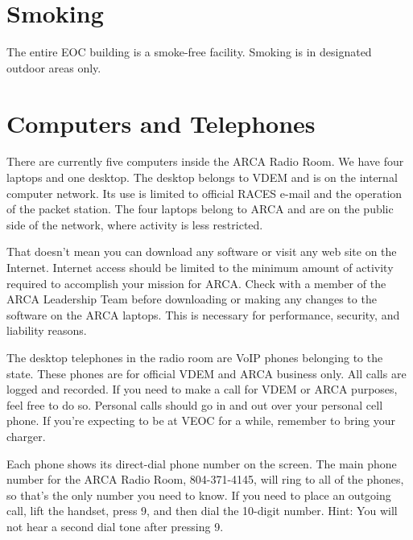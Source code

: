 \documentclass[pdflatex,letterpaper,twoside,12pt]{book}
\begin{document}

\section{Smoking}

The entire EOC building is a smoke-free facility.  Smoking is in designated outdoor areas only.


\section{Computers and Telephones}

There are currently five computers inside the ARCA Radio Room.  We have four laptops and one desktop.  The desktop belongs to VDEM and is on the internal computer network.  Its use is limited to official RACES e-mail and the operation of the packet station.  The four laptops belong to ARCA and are on the public side of the network, where activity is less restricted.

That doesn't mean you can download any software or visit any web site on the Internet.  Internet access should be limited to the minimum amount of activity required to accomplish your mission for ARCA.  Check with a member of the ARCA Leadership Team before downloading or making any changes to the software on the ARCA laptops.  This is necessary for performance, security, and liability reasons.

The desktop telephones in the radio room are VoIP phones belonging to the state.  These phones are for official VDEM and ARCA business only.  All calls are logged and recorded.  If you need to make a call for VDEM or ARCA purposes, feel free to do so.  Personal calls should go in and out over your personal cell phone.  If you're expecting to be at VEOC for a while, remember to bring your charger.

Each phone shows its direct-dial phone number on the screen.  The main phone number for the ARCA Radio Room, 804-371-4145, will ring to all of the phones, so that's the only number you need to know.  If you need to place an outgoing call, lift the handset, press 9, and then dial the 10-digit number.  Hint: You will not hear a second dial tone after pressing 9.
\end{document}

